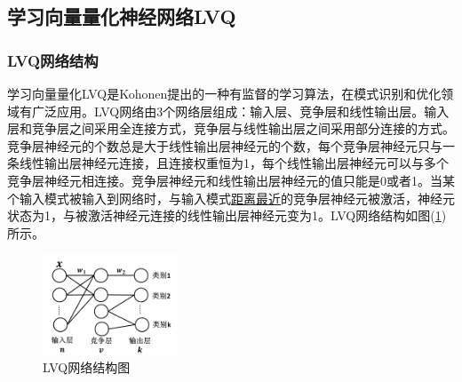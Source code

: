 {    \subsection{学习向量量化神经网络LVQ}
        \subsubsection{LVQ网络结构}
            \par
            学习向量量化LVQ是Kohonen提出的一种有监督的学习算法，在模式识别和优化领域有广泛应用。LVQ网络由3个网络层组成：输入层、竞争层和线性输出层。输入层和竞争层之间采用全连接方式，竞争层与线性输出层之间采用部分连接的方式。竞争层神经元的个数总是大于线性输出层神经元的个数，每个竞争层神经元只与一条线性输出层神经元连接，且连接权重恒为1，每个线性输出层神经元可以与多个竞争层神经元相连接。竞争层神经元和线性输出层神经元的值只能是0或者1。当某个输入模式被输入到网络时，与输入模式\underline{距离最近}的竞争层神经元被激活，神经元状态为1，与被激活神经元连接的线性输出层神经元变为1。LVQ网络结构如图(\ref{fig:LVQ网络结构图})所示。
            \begin{figure}[H]
            \centering
            \includegraphics[height=3cm]{images/LVQ_net_sructure.jpg}
            \caption{LVQ网络结构图}
            \label{fig:LVQ网络结构图}
            \end{figure}
}
